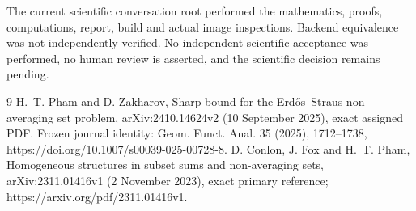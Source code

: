 \documentclass[10pt]{article}
\begin{document}
The current scientific conversation root performed the mathematics, proofs, computations, report, build and actual image inspections. Backend equivalence was not independently verified. No independent scientific acceptance was performed, no human review is asserted, and the scientific decision remains pending.\par
9 H. T. Pham and D. Zakharov, Sharp bound for the Erdős–Straus non-averaging set problem, arXiv:2410.14624v2 (10 September 2025), exact assigned PDF. Frozen journal identity: Geom. Funct. Anal. 35 (2025), 1712–1738, https://doi.org/10.1007/s00039-025-00728-8. D. Conlon, J. Fox and H. T. Pham, Homogeneous structures in subset sums and non-averaging sets, arXiv:2311.01416v1 (2 November 2023), exact primary reference; https://arxiv.org/pdf/2311.01416v1.\par
\end{document}
